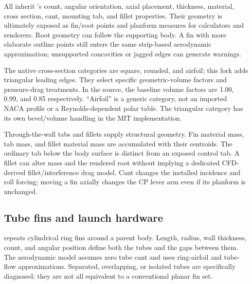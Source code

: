 All inherit 's count, angular orientation, axial placement, thickness, material, cross section, cant, mounting tab, and fillet properties. Their geometry is ultimately exposed as fin/root points and planform measures for calculators and renderers. Root geometry can follow the supporting body. A fin with more elaborate outline points still enters the same strip-based aerodynamic approximation; unsupported concavities or jagged edges can generate warnings.

The native cross-section categories are square, rounded, and airfoil; this fork adds triangular leading edges. They select specific geometric-volume factors and pressure-drag treatments. In the source, the baseline volume factors are 1.00, 0.99, and 0.85 respectively. ``Airfoil'' is a generic category, not an imported NACA profile or a Reynolds-dependent polar table. The triangular category has its own bevel/volume handling in the MIT implementation.

Through-the-wall tabs and fillets supply structural geometry. Fin material mass, tab mass, and fillet material mass are accumulated with their centroids. The ordinary tab below the body surface is distinct from an exposed control tab. A fillet can alter mass and the rendered root without implying a dedicated CFD-derived fillet/interference drag model. Cant changes the installed incidence and roll forcing; moving a fin axially changes the CP lever arm even if its planform is unchanged.


\subsection{Tube fins and launch hardware}
 repeats cylindrical ring fins around a parent body. Length, radius, wall thickness, count, and angular position define both the tubes and the gaps between them. The aerodynamic model assumes zero tube cant and uses ring-airfoil and tube-flow approximations. Separated, overlapping, or isolated tubes are specifically diagnosed; they are not all equivalent to a conventional planar fin set.

